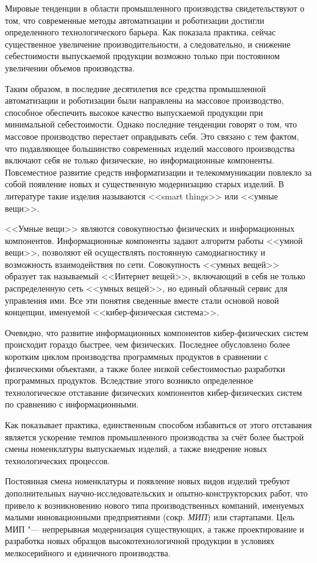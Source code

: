 
{\actuality} Мировые тенденции в области промышленного производства свидетельствуют о том, что современные методы автоматизации и роботизации достигли определенного технологического барьера. Как показала практика, сейчас существенное увеличение производительности, а следовательно, и снижение себестоимости выпускаемой продукции возможно только при постоянном увеличении объемов производства.

Таким образом, в последние десятилетия все средства промышленной автоматизации и роботизации были направлены на массовое производство, способное обеспечить высокое качество выпускаемой продукции при минимальной себестоимости. Однако последние тенденции говорят о том, что массовое производство перестает оправдывать себя. Это связано с тем фактом, что подавляющее большинство современных изделий массового производства включают себя не только физические, но информационные компоненты. Повсеместное развитие средств информатизации и телекоммуникации повлекло за собой появление новых и существенную модернизацию старых изделий. В литературе такие изделия называются <<smart things>> или <<умные вещи>>. 

<<Умные вещи>> являются совокупностью физических и информационных компонентов. Информационные компоненты задают алгоритм работы <<умной вещи>>, позволяют ей осуществлять постоянную самодиагностику и возможность взаимодействия по сети.  Совокупность <<умных вещей>> образует так называемый <<Интернет вещей>>, включающий в себя не только распределенную сеть <<умных вещей>>, но единый облачный сервис для управления ими. Все эти понятия сведенные вместе стали основой новой концепции, именуемой <<кибер-физическая система>>.

Очевидно, что развитие информационных компонентов кибер-физических систем происходит гораздо быстрее, чем физических. Последнее обусловлено более коротким циклом производства программных продуктов в сравнении с физическими объектами, а также более низкой себестоимостью разработки программных продуктов. Вследствие этого возникло определенное технологическое отставание физических компонентов кибер-физических систем по сравнению с информационными.

Как показывает практика, единственным способом избавиться от этого отставания является ускорение темпов промышленного производства за счёт более быстрой смены номенклатуры выпускаемых изделий, а также внедрение новых технологических процессов.

Постоянная смена номенклатуры и появление новых видов изделий требуют дополнительных научно-исследовательских и опытно-конструкторских работ, что привело к возникновению нового типа производственных компаний, именуемых малыми инновационными предприятиями (сокр. \textit{МИП}) или стартапами. Цель МИП "--- непрерывная модернизация существующих, а также проектирование и разработка новых образцов высокотехнологичной продукции в условиях мелкосерийного и единичного производства.

